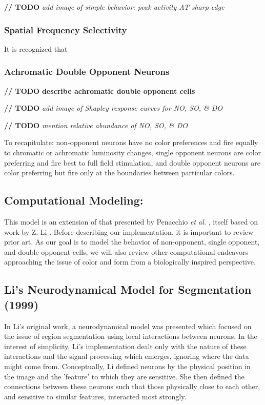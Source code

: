\documentclass[journal,onecolumn]{IEEEtran}
\begin{document}
\textbf{// TODO} \textit{add image of simple behavior: peak activity AT sharp edge}


\subsubsection*{Spatial Frequency Selectivity}

It is recognized that


\subsubsection*{Achromatic Double Opponent Neurons}

\textbf{// TODO} \textbf{describe achromatic double opponent cells}



\textbf{// TODO} \textit{add image of Shapley response curves for NO, SO, \& DO}

\textbf{// TODO} \textit{mention relative abundance of NO, SO, \& DO}

To recapitulate: non-opponent neurons have no color preferences and fire equally to chromatic or achromatic luminosity changes, single opponent neurons are color preferring and fire best to full field stimulation, and double opponent neurons are color preferring but fire only at the boundaries between particular colors.


\subsection{Computational Modeling:}

This model is an extension of that presented by Penacchio \textit{et al.} \cite{otazu:plosone}, itself based on work by Z. Li \cite{li:1998, li:1999}. Before describing our implementation, it is important to review prior art. As our goal is to model the behavior of non-opponent, single opponent, and double opponent cells, we will also review other computational endeavors approaching the issue of color and form from a biologically inspired perspective.


\subsection*{Li's Neurodynamical Model for Segmentation (1999)}
In Li's original work, a neurodynamical model was presented which focused on the issue of region segmentation using local interactions between neurons. In the interest of simplicity, Li's implementation dealt only with the nature of these interactions and the signal processing which emerges, ignoring where the data might come from. Conceptually, Li defined neurons by the physical position in the image and the 'feature' to which they are sensitive. She then defined the connections between these neurons such that those physically close to each other, and sensitive to similar features, interacted most strongly.
\end{document}
